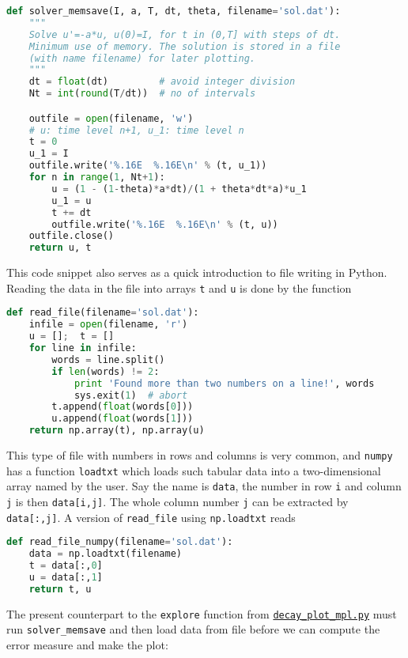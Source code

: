 \documentclass[graybox,sectrefs,envcountresetchap,open=right,final]{svmonodo}
\begin{document}
\begin{lstlisting}[language=Python,style=blue1_bluegreen]
def solver_memsave(I, a, T, dt, theta, filename='sol.dat'):
    """
    Solve u'=-a*u, u(0)=I, for t in (0,T] with steps of dt.
    Minimum use of memory. The solution is stored in a file
    (with name filename) for later plotting.
    """
    dt = float(dt)         # avoid integer division
    Nt = int(round(T/dt))  # no of intervals

    outfile = open(filename, 'w')
    # u: time level n+1, u_1: time level n
    t = 0
    u_1 = I
    outfile.write('%.16E  %.16E\n' % (t, u_1))
    for n in range(1, Nt+1):
        u = (1 - (1-theta)*a*dt)/(1 + theta*dt*a)*u_1
        u_1 = u
        t += dt
        outfile.write('%.16E  %.16E\n' % (t, u))
    outfile.close()
    return u, t
\end{lstlisting}
This code snippet also serves as a quick introduction to file writing in Python.
Reading the data in the file into arrays \texttt{t} and \texttt{u} is done by the
function

\begin{lstlisting}[language=Python,style=blue1_bluegreen]
def read_file(filename='sol.dat'):
    infile = open(filename, 'r')
    u = [];  t = []
    for line in infile:
        words = line.split()
        if len(words) != 2:
            print 'Found more than two numbers on a line!', words
            sys.exit(1)  # abort
        t.append(float(words[0]))
        u.append(float(words[1]))
    return np.array(t), np.array(u)
\end{lstlisting}

This type of file with numbers in rows and columns is very common, and
\texttt{numpy} has a function \texttt{loadtxt} which loads such tabular data into a
two-dimensional array named by the user. Say the name is \texttt{data}, the
number in row \texttt{i} and column \texttt{j} is then \texttt{data[i,j]}.  The whole
column number \texttt{j} can be extracted by \texttt{data[:,j]}.  A version of
\Verb!read_file! using \texttt{np.loadtxt} reads

\begin{lstlisting}[language=Python,style=blue1_bluegreen]
def read_file_numpy(filename='sol.dat'):
    data = np.loadtxt(filename)
    t = data[:,0]
    u = data[:,1]
    return t, u
\end{lstlisting}

The present counterpart to the \texttt{explore} function from
\href{{http://tinyurl.com/ofkw6kc/alg/decay_plot_mpl.py}}{\nolinkurl{decay_plot_mpl.py}} must run
\Verb!solver_memsave! and then load data from file before we can compute
the error measure and make the plot:
\end{document}
